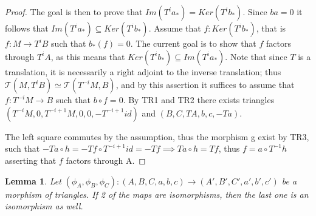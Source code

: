 \documentclass[12pt]{article}
\newtheorem{lemma}[theorem]{Lemma}
\theoremstyle{definition}
\theoremstyle{remark}
\begin{document}
\begin{proof}
                The goal is then to prove that $Im(T^ia_*)=Ker(T^ib_*)$. Since $ba=0$ it follows that $Im(T^ia_*) \subseteq Ker(T^ib_*)$. Assume that $f:Ker(T^ib_*)$, that is $f:M\rightarrow T^iB$ such that $b_*(f)=0$. The current goal is to show that $f$ factors through $T^iA$, as this means that $Ker(T^ib_*)\subseteq Im(T^ia_*)$. Note that since $T$ is a translation, it is necessarily a right adjoint to the inverse translation; thus $\mathcal{T}(M,T^iB) \simeq\mathcal{T}(T^{-i}M,B)$, and by this assertion it suffices to assume that $f:T^{-i}M\rightarrow B$ such that $b\circ f = 0$. By TR1 and TR2 there exists triangles $(T^{-i}M,0,T^{-i+1}M,0,0,-T^{-i+1}id)$ and $(B,C,TA,b,c,-Ta)$. 
                \begin{center}
                \end{center}
                The left square commutes by the assumption, thus the morphism g exist by TR3, such that $-Ta\circ h = -Tf\circ T^{-i+1}id = -Tf \implies Ta\circ h = Tf$, thus $f = a\circ T^{-1}h$ asserting that $f$ factors through A.
            \end{proof}
            \begin{lemma}
                Let $(\phi_A, \phi_B, \phi_C):(A,B,C,a,b,c) \rightarrow (A',B',C',a',b',c')$ be a morphism of triangles. If 2 of the maps are isomorphisms, then the last one is an isomorphism as well.
                \begin{center}
                \end{center}
            \end{lemma}
\end{document}
